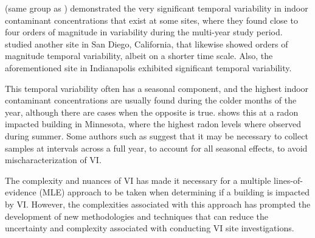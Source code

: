 \citeauthor{holton_temporal_2013}\cite{holton_temporal_2013} (same group as \citeauthor{guo_identification_2015}) demonstrated the very significant temporal variability in indoor contaminant concentrations that exist at some sites, where they found close to four orders of magnitude in variability during the multi-year study period.
\citeauthor{hosangadi_high-frequency_2017}\cite{hosangadi_high-frequency_2017} studied another site in San Diego, California, that likewise showed orders of magnitude temporal variability, albeit on a shorter time scale.
Also, the aforementioned site in Indianapolis exhibited significant temporal variability\cite{schumacher_fluctuation_2012}.\par

This temporal variability often has a seasonal component, and the highest indoor contaminant concentrations are usually found during the colder months of the year\cite{schumacher_fluctuation_2012,holton_temporal_2013}, although there are cases when the opposite is true.
\citeauthor{steck_indoor_2004}\cite{steck_indoor_2004} shows this at a radon impacted building in Minnesota, where the highest radon levels where observed during summer.
Some authors such as \citeauthor{bekele_influence_2014}\cite{bekele_influence_2014} suggest that it may be necessary to collect samples at intervals across a full year, to account for all seasonal effects, to avoid mischaracterization of VI.\par

The complexity and nuances of VI has made it necessary for a multiple lines-of-evidence (MLE) approach to be taken when determining if a building is impacted by VI\cite{u.s._environmental_protection_agency_oswer_2015,pennell_field_2016}.
However, the complexities associated with this approach has prompted the development of new methodologies and techniques that can reduce the uncertainty and complexity associated with conducting VI site investigations.\par

